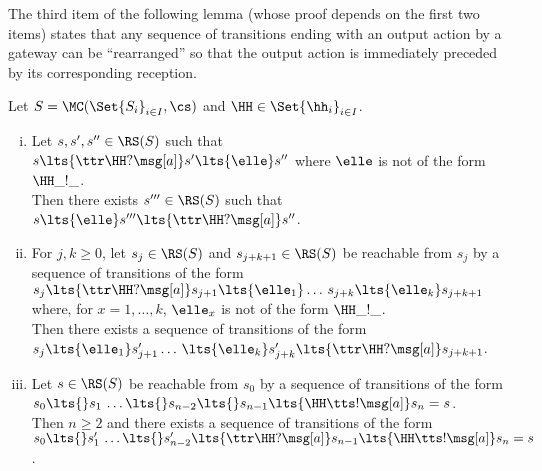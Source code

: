 The third item of the following lemma (whose proof depends on the first two items)
states that any sequence of transitions ending with an output action by a gateway
can be ``rearranged'' so that the output action is immediately preceded
by its corresponding reception. 


\begin{lemma}
\label{lem:swap-rolf}
Let $S = \MC(\Set{S_i}_{i\in I}, \cs)$ and $\HH \in \Set{\hh_i}_{i\in I}$.

\begin{enumerate}[i)]
\item\label{lem:swap-rolf-item1}
Let $s,s',s''\in \RS(S)$  such that\\
\hspace*{30mm}
$s\lts{\ttr\HH?\msg[a]}s'\lts{\elle}s''$
 where $\elle$ is not of the form $\HH\_!\_$.\\
Then there exists $s'''\in \RS(S)$ such that $s\lts{\elle}s'''\lts{\ttr\HH?\msg[a]}s''$.

\item\label{lem:swap-rolf-item2}
For $j,k \geq 0$, let $s_j \in \RS(S)$ and $s_{j+k+1} \in \RS(S)$ be reachable from $s_j$ by a sequence of transitions of the form
$s_j  \lts{\ttr\HH?\msg[a]} s_{j+1}\lts{\elle_1}\ldots\, s_{j+k}\lts{\elle_{k}}s_{j+k+1}$
 where, for $x = 1,\ldots,k$,  $\elle_x$ is not of the form $\HH\_!\_$.\\
Then  there exists a sequence of transitions of the form
\\
\hspace*{30mm}
$s_j  \lts{\elle_1}s'_{j+1} \ldots\,  \lts{\elle_k} s'_{j+k} \lts{\ttr\HH?\msg[a]}s_{j+k+1}$.

\item\label{lem:swap-rolf-item3}
Let $s \in \RS(S)$ be reachable from $s_0$ by a sequence of
transitions of the form\\
\hspace*{30mm}
$s_0\lts{}  s_1\,\ldots \lts{} s_{n-2}  \lts{} s_{n-1}\lts{\HH\tts!\msg[a]}s_n=s$.\\
Then $n \geq 2$ and there exists a sequence of transitions of the form
\\
\hspace*{30mm}
$s_0\lts{} s'_1\,\ldots \lts{} s'_{n-2}\lts{\ttr\HH?\msg[a]}s_{n-1}\lts{\HH\tts!\msg[a]}s_n=s$.
\end{enumerate}
\end{lemma}

